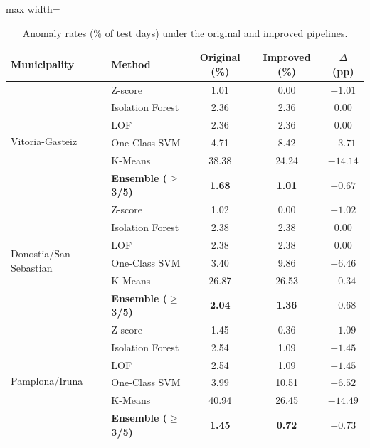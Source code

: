 ﻿\documentclass[12pt,reqno, twoside]{amsbook}
\numberwithin{figure}{chapter}
\numberwithin{table}{chapter}
\numberwithin{equation}{chapter}
\theoremstyle{plain}
\numberwithin{equation}{chapter}
\numberwithin{section}{chapter}
\begin{document}
\begin{table}[htbp]
\centering
\caption{Anomaly rates (\% of test days) under the original and improved pipelines.}
\label{tab:pipeline_comparison}
\begin{adjustbox}{max width=\textwidth}
\begin{tabular}{llccc}
\toprule
\textbf{Municipality} & \textbf{Method} & \textbf{Original (\%)} & \textbf{Improved (\%)} & \textbf{$\Delta$ (pp)} \\
\midrule
\multirow{6}{*}{Vitoria-Gasteiz}
  & Z-score                       &  1.01 &  0.00 & $-1.01$ \\
  & Isolation Forest              &  2.36 &  2.36 &    0.00 \\
  & \ac{LOF}                      &  2.36 &  2.36 &    0.00 \\
  & One-Class \ac{SVM}            &  4.71 &  8.42 & $+3.71$ \\
  & K-Means                       & 38.38 & 24.24 & $-14.14$ \\
  & \textbf{Ensemble ($\geq$3/5)} & \textbf{1.68} & \textbf{1.01} & \textbf{$-0.67$} \\
\midrule
\multirow{6}{*}{Donostia/San Sebastian}
  & Z-score                       &  1.02 &  0.00 & $-1.02$ \\
  & Isolation Forest              &  2.38 &  2.38 &    0.00 \\
  & \ac{LOF}                      &  2.38 &  2.38 &    0.00 \\
  & One-Class \ac{SVM}            &  3.40 &  9.86 & $+6.46$ \\
  & K-Means                       & 26.87 & 26.53 & $-0.34$ \\
  & \textbf{Ensemble ($\geq$3/5)} & \textbf{2.04} & \textbf{1.36} & \textbf{$-0.68$} \\
\midrule
\multirow{6}{*}{Pamplona/Iruna}
  & Z-score                       &  1.45 &  0.36 & $-1.09$ \\
  & Isolation Forest              &  2.54 &  1.09 & $-1.45$ \\
  & \ac{LOF}                      &  2.54 &  1.09 & $-1.45$ \\
  & One-Class \ac{SVM}            &  3.99 & 10.51 & $+6.52$ \\
  & K-Means                       & 40.94 & 26.45 & $-14.49$ \\
  & \textbf{Ensemble ($\geq$3/5)} & \textbf{1.45} & \textbf{0.72} & \textbf{$-0.73$} \\
\bottomrule
\end{tabular}
\end{adjustbox}
\end{table}
\end{document}
